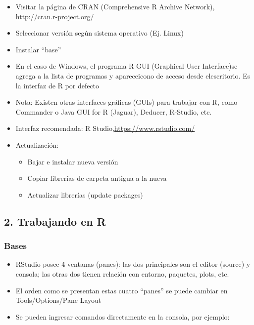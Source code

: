 \documentclass[]{article}
\providecommand{\tightlist}{%
  \setlength{\itemsep}{0pt}\setlength{\parskip}{0pt}}
\begin{document}
\begin{itemize}
\item
  Visitar la página de CRAN (Comprehensive R Archive Network),
  \url{http://cran.r-project.org/}
\item
  Seleccionar versión según sistema operativo (Ej. Linux)
\item
  Instalar ``base''
\item
  En el caso de Windows, el programa R GUI (Graphical User Interface)se
  agrega a la lista de programas y apareceicono de acceso desde
  elescritorio. Es la interfaz de R por defecto
\item
  Nota: Existen otras interfaces gráficas (GUIs) para trabajar con R,
  como Commander o Java GUI for R (Jaguar), Deducer, R-Studio, etc.
\item
  Interfaz recomendada: R Studio,\url{https://www.rstudio.com/}
\item
  Actualización:

  \begin{itemize}
  \tightlist
  \item
    Bajar e instalar nueva versión
  \item
    Copiar librerías de carpeta antigua a la nueva
  \item
    Actualizar librerías (update packages)
  \end{itemize}
\end{itemize}

\hypertarget{trabajando-en-r}{%
\subsection{2. Trabajando en R}\label{trabajando-en-r}}

\hypertarget{bases}{%
\subsubsection{Bases}\label{bases}}

\begin{itemize}
\tightlist
\item
  RStudio posee 4 ventanas (panes): las dos principales son el editor
  (source) y consola; las otras dos tienen relación con entorno,
  paquetes, plots, etc.
\item
  El orden como se presentan estas cuatro ``panes'' se puede cambiar en
  Tools/Options/Pane Layout
\item
  Se pueden ingresar comandos directamente en la consola, por ejemplo:
\end{itemize}
\end{document}
